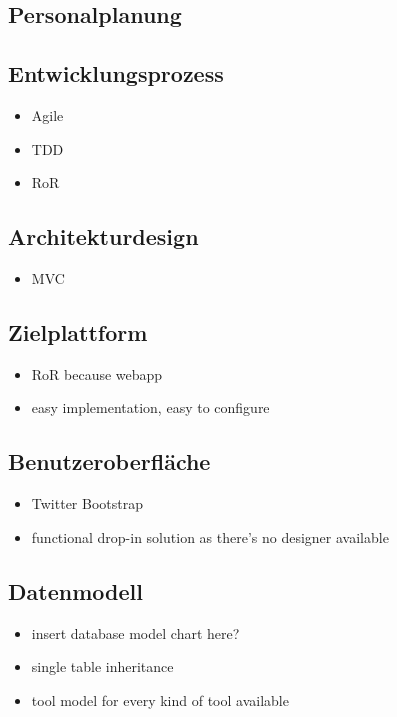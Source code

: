 \subsection{Personalplanung}
\label{sec:Personalplanung}

\subsection{Entwicklungsprozess}
\label{sec:Entwicklungsprozess}
\begin{itemize}
	\item Agile
	\item TDD
	\item RoR
\end{itemize}

\subsection{Architekturdesign}
\label{sec:Architekturdesign}
\begin{itemize}
	\item MVC
\end{itemize}

\subsection{Zielplattform}
\label{sec:Zielplattform}
\begin{itemize}
	\item RoR because webapp
	\item easy implementation, easy to configure
\end{itemize}

\subsection{Benutzeroberfläche}
\label{sec:Benutzeroberfläche}
\begin{itemize}
	\item Twitter Bootstrap
	\item functional drop-in solution as there's no designer available
\end{itemize}

\subsection{Datenmodell}
\label{sec:Datenmodell}
\begin{itemize}
	\item insert database model chart here?
	\item single table inheritance
	\item tool model for every kind of tool available
\end{itemize}

